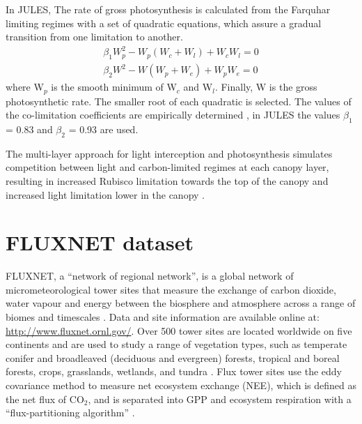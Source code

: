 In JULES, The rate of gross photosynthesis is calculated from the Farquhar limiting regimes with a set of quadratic equations, which assure a gradual transition from one limitation to another. 
\begin{equation}\label{quadratic}
\begin{split}
\beta_1 W_p^2-W_p(W_c+W_l)+W_cW_l=0 \\
\beta_2 W^2-W(W_p+W_e)+W_pW_e=0
\end{split}
\end{equation}
\noindent where W$_p$ is the smooth minimum of W$_c$ and W$_l$. Finally, W is the gross photosynthetic rate. The smaller root of each quadratic is selected. The values of the co-limitation coefficients are empirically determined \citep{Collatz1990}, in JULES the values $\beta_1$ = 0.83 and $\beta_2$ = 0.93 are used. 

The multi-layer approach for light interception and photosynthesis simulates competition between light and carbon-limited regimes at each canopy layer, resulting
in increased Rubisco limitation towards the top of the canopy and increased light limitation lower in the canopy \citep{Clark2011}.

\section{FLUXNET dataset}

FLUXNET, a ``network of regional network'', is a global network of micrometeorological tower sites that measure the exchange of carbon dioxide, water vapour and energy between the biosphere and atmosphere across a range of biomes and timescales \citep{Baldocchi2001}. Data and site information are available online at: \url{http://www.fluxnet.ornl.gov/}. Over 500 tower sites are located worldwide on five continents and are used to study a range of vegetation types, such as temperate conifer and broadleaved (deciduous and evergreen) forests, tropical and boreal forests, crops, grasslands, wetlands, and tundra \citep{Baldocchi2001}.
Flux tower sites use the eddy covariance method to measure net ecosystem exchange (NEE), which is defined as the net flux of CO$_2$, and is separated into GPP and ecosystem respiration with a ``flux-partitioning algorithm'' \citep{Reichstein2005}.


